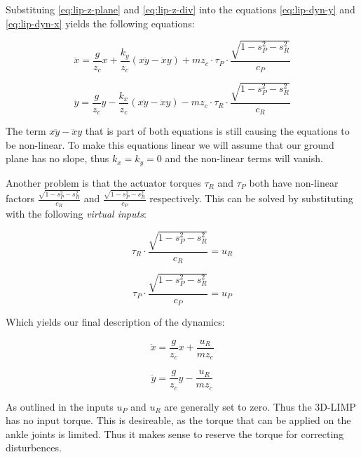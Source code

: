 \documentclass[english,ngerman]{KITreprt}
\begin{document}
Substituing \ref{eq:lip-z-plane} and \ref{eq:lip-z-div} into the
equations \ref{eq:lip-dyn-y} and \ref{eq:lip-dyn-x} yields the following
equations:

\begin{equation}
\ddot{x} = \frac{g}{z_c} x + \frac{k_y}{z_c} (x\ddot{y} - \ddot{x}y) + m z_c \cdot \tau_P \cdot \frac{\sqrt{1 - s_P^2 - s_R^2}}{c_P}
\end{equation}

\begin{equation}
\ddot{y} = \frac{g}{z_c} y - \frac{k_x}{z_c} (x\ddot{y} - \ddot{x}y) - m z_c \cdot \tau_R \cdot \frac{\sqrt{1 - s_P^2 - s_R^2}}{c_R}
\end{equation}

The term $x\ddot{y} - \ddot{x}y$ that is part of both equations is still
causing the equations to be non-linear. To make this equations linear we
will assume that our ground plane has no slope, thus $k_x = k_y = 0$ and
the non-linear terms will vanish.

Another problem is that the actuator torques $\tau_R$ and $\tau_P$ both
have non-linear factors $\frac{\sqrt{1 - s_P^2 - s_R^2}}{c_R}$ and
$\frac{\sqrt{1 - s_P^2 - s_R^2}}{c_P}$ respectively. This can be solved
by substituting with the following \emph{virtual inputs}:

\begin{equation}
\tau_R \cdot \frac{\sqrt{1 - s_P^2 - s_R^2}}{c_R} = u_R
\end{equation}

\begin{equation}
\tau_P \cdot \frac{\sqrt{1 - s_P^2 - s_R^2}}{c_P} = u_P
\end{equation}

Which yields our final description of the dynamics:

\begin{equation} \label{eq:lip-x}
\ddot{x} = \frac{g}{z_c} x + \frac{u_R}{m z_c}
\end{equation}

\begin{equation} \label{eq:lip-y}
\ddot{y} = \frac{g}{z_c} y - \frac{u_R}{m z_c}
\end{equation}

As outlined in \cite{kajita20013d} the inputs $u_P$ and $u_R$ are
generally set to zero. Thus the 3D-LIMP has no input torque. This is
desireable, as the torque that can be applied on the ankle joints is
limited. Thus it makes sense to reserve the torque for correcting
disturbences.
\end{document}
